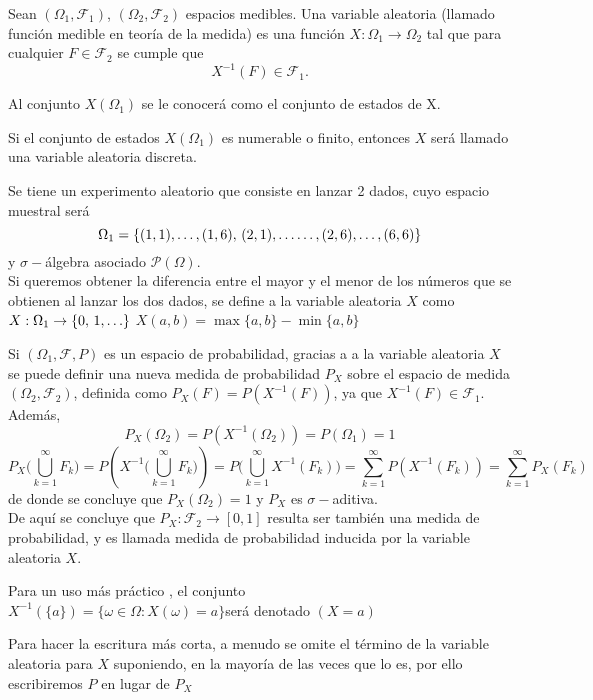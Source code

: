 \begin{Def}
    Sean $(\Omega_1,\mathscr{F}_1)$, $(\Omega_2,\mathscr{F}_2)$ espacios medibles. Una variable aleatoria (llamado función medible en teoría de la medida) es una función $X:\Omega_1\rightarrow \Omega_2$ tal que para cualquier $F\in\mathscr{F}_2$ se cumple que $$X^{-1}(F)\in\mathscr{F}_1.$$
\end{Def}
 Al conjunto $X(\Omega_1)$ se le conocerá como el conjunto de estados de X.
\begin{Obs}
    Si el conjunto de estados $X(\Omega_1)$ es numerable o finito, entonces $X$ será llamado una variable aleatoria discreta.
\end{Obs}
\begin{Ejm}
  Se tiene un experimento aleatorio que consiste en lanzar 2 dados, cuyo  espacio muestral será $$\Omega_1=\{(1,1),\ldots,(1,6),\thinspace(2,1),\ldots\ldots,(2,6),\ldots,(6,6)\}$$y $\sigma-$álgebra asociado $\mathscr{P}(\Omega)$.\\ 
   Si queremos obtener la diferencia entre el mayor y el menor de los números que se obtienen al lanzar los dos dados, se define a la variable aleatoria $X$ como $X:\Omega_1\rightarrow \{0,\thinspace 1,\ldots\}$ $X(a,b)=\max \{a,b\}-\min\{a,b\}$
\end{Ejm}
Si $(\Omega_1,\mathscr{F},P)$ es un espacio de probabilidad, gracias a a la variable aleatoria $X$ se puede definir una nueva medida de probabilidad $P_X$ sobre el espacio de medida $(\Omega_2,\mathscr{F}_2)$, definida como $P_X(F)=P(X^{-1}(F))$, ya que $X^{-1}(F)\in\mathscr{F}_1$. Además, $$P_X(\Omega_2)=P(X^{-1}(\Omega_2))=P(\Omega_1)=1$$ $$P_X\big(\bigcup_{k=1}^\infty F_k\big)=P(X^{-1}\big(\bigcup_{k=1}^\infty
F_k\big))=P \big(\bigcup_{k=1}^\infty X^{-1}(F_k) \big)=\sum_{k=1}^\infty P(X^{-1}(F_k))=\sum_{k=1}^\infty P_X(F_k)$$
de donde se concluye que $P_X(\Omega_2)= 1$ y $P_X$ es $\sigma-$aditiva.\\
De aquí se concluye que $P_X:\mathscr{F_2}\rightarrow [0,1]$ resulta ser también una medida de probabilidad, y es llamada medida de probabilidad inducida por la variable aleatoria $X$.\\
\begin{Obs}
    Para un uso más práctico , el conjunto\\ $X^{-1}(\{a\})=\{\omega\in\Omega: X(\omega)=a\}$será denotado $(X= a)$\\
\end{Obs}
Para hacer la escritura más corta, a menudo se omite el término de la variable aleatoria para $X$ suponiendo, en la mayoría de las veces que lo es, por ello escribiremos $P$ en lugar de $P_X$\\\\
